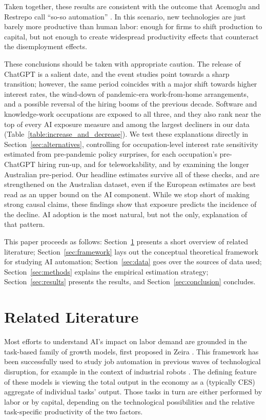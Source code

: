 \documentclass[11pt]{article}
\begin{document}
Taken together, these results are consistent with the outcome that Acemoglu and Restrepo call ``so-so automation'' \citep{acemoglu_automation_2019}. In this scenario, new technologies are just barely more productive than human labor: enough for firms to shift production to capital, but not enough to create widespread productivity effects that counteract the disemployment effects. 

These conclusions should be taken with appropriate caution. The release of ChatGPT is a salient date, and the event studies point towards a sharp transition; however, the same period coincides with a major shift towards higher interest rates, the wind-down of pandemic-era work-from-home arrangements, and a possible reversal of the hiring booms of the previous decade. Software and knowledge-work occupations are exposed to all three, and they also rank near the top of every AI exposure measure and among the largest decliners in our data (Table~\ref{table:increase_and_decrease}). We test these explanations directly in Section~\ref{sec:alternatives}, controlling for occupation-level interest rate sensitivity estimated from pre-pandemic policy surprises, for each occupation's pre-ChatGPT hiring run-up, and for teleworkability, and by examining the longer Australian pre-period. Our headline estimates survive all of these checks, and are strengthened on the Australian dataset, even if the European estimates are best read as an upper bound on the AI component. While we stop short of making strong causal claims, these findings show that exposure predicts the incidence of the decline. AI adoption is the most natural, but not the only, explanation of that pattern.

This paper proceeds as follows: Section~\ref{sec:literature} presents a short overview of related literature; Section~\ref{sec:framework} lays out the conceptual theoretical framework for studying AI automation; Section~\ref{sec:data} goes over the sources of data used; Section~\ref{sec:methods} explains the empirical estimation strategy; Section~\ref{sec:results} presents the results, and Section~\ref{sec:conclusion} concludes.

\section{Related Literature}
\label{sec:literature}

Most efforts to understand AI's impact on labor demand are grounded in the task-based family of growth models, first proposed in Zeira \citep{zeira1998workers}. This framework has been successfully used to study job automation in previous waves of technological disruption, for example in the context of industrial robots \citep{AcemogluRestrepo2020Robots}. The defining feature of these models is viewing the total output in the economy as a (typically CES) aggregate of individual tasks' output. Those tasks in turn are either performed by labor or by capital, depending on the technological possibilities and the relative task-specific productivity of the two factors.
\end{document}
